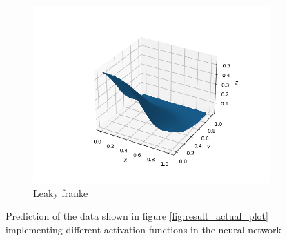 \documentclass[../main.tex]{subfiles}
\begin{document}
\begin{figure}[htb!]
    \begin{subfigure}[b]{0.48\textwidth}
        \centering
        \includegraphics[trim=2.4cm 1cm 1.4cm 1cm, clip,width=1.1\textwidth]{../assets/nn_sigmoid_franke_plot.png}
        \caption{Leaky franke}
    \end{subfigure}
    \caption{Prediction of the data shown in figure \ref{fig:result_actual_plot} implementing different activation functions in the neural network}
    \label{fig:result_franke_plots}
\end{figure}
\end{document}
